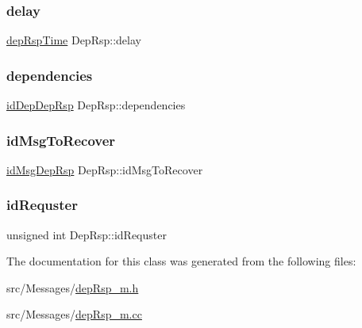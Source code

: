 \subsubsection{\texorpdfstring{delay}{delay}}
{\footnotesize\ttfamily \hyperlink{depRsp__m_8h_ab118b8474723cf26f98151aae3d55940}{dep\+Rsp\+Time} Dep\+Rsp\+::delay\hspace{0.3cm}{\ttfamily [protected]}}

\mbox{\label{classDepRsp_a0881ee52098e202a4486da80efa6ce1f}} 
\subsubsection{\texorpdfstring{dependencies}{dependencies}}
{\footnotesize\ttfamily \hyperlink{depRsp__m_8h_a3c2ceb107008eb344443aaab2eb872b8}{id\+Dep\+Dep\+Rsp} Dep\+Rsp\+::dependencies\hspace{0.3cm}{\ttfamily [protected]}}

\mbox{\label{classDepRsp_a7b777428e859ba7a6f083e13f6431cf4}} 
\subsubsection{\texorpdfstring{id\+Msg\+To\+Recover}{idMsgToRecover}}
{\footnotesize\ttfamily \hyperlink{depRsp__m_8h_a8a41011e0821f196429cd4bc45638bcf}{id\+Msg\+Dep\+Rsp} Dep\+Rsp\+::id\+Msg\+To\+Recover\hspace{0.3cm}{\ttfamily [protected]}}

\mbox{\label{classDepRsp_ae8c6f097db47049e4cb84e6788f9d58d}} 
\subsubsection{\texorpdfstring{id\+Requster}{idRequster}}
{\footnotesize\ttfamily unsigned int Dep\+Rsp\+::id\+Requster\hspace{0.3cm}{\ttfamily [protected]}}



The documentation for this class was generated from the following files\+:\begin{DoxyCompactItemize}
\item 
src/\+Messages/\hyperlink{depRsp__m_8h}{dep\+Rsp\+\_\+m.\+h}\item 
src/\+Messages/\hyperlink{depRsp__m_8cc}{dep\+Rsp\+\_\+m.\+cc}\end{DoxyCompactItemize}
